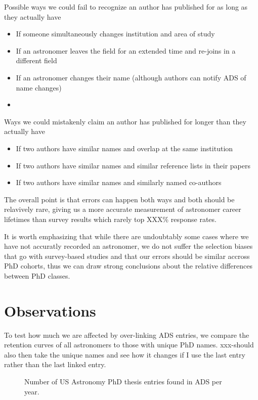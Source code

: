 \documentclass{emulateapj}
\begin{document}
Possible ways we could fail to recognize an author has published for as long as they actually have
\begin{itemize}
\item{If someone simultaneously changes institution and area of study}
  \item{If an astronomer leaves the field for an extended time and re-joins in a different field}
\item{If an astronomer changes their name (although authors can notify ADS of name changes)}
  \item{}
\end{itemize}

Ways we could mistakenly claim an author has published for longer than they actually have
\begin{itemize}
\item{If two authors have similar names and overlap at the same institution}
\item{If two authors have similar names and similar reference lists in their papers}
  \item{If two authors have similar names and similarly named co-authors}
\end{itemize}

The overall point is that errors can happen both ways and both should be relavively rare, giving us a more accurate measurement of astronomer career lifetimes than survey results which rarely top XXX\% response rates.

It is worth emphasizing that while there are undoubtably some cases where we have not accuratly recorded an astronomer, we do not suffer the selection biases that go with survey-based studies and that our errors should be similar accross PhD cohorts, thus we can draw strong conclusions about the relative differences between PhD classes.

\section{Observations}

To test how much we are affected by over-linking ADS entries, we compare the retention curves of all astronomers to those with unique PhD names.  xxx-should also then take the unique names and see how it changes if I use the last entry rather than the last linked entry.


\begin{figure}
  \caption{Number of US Astronomy PhD thesis entries found in ADS per year. \label{fig:phdperyear}}
\end{figure}
\end{document}

